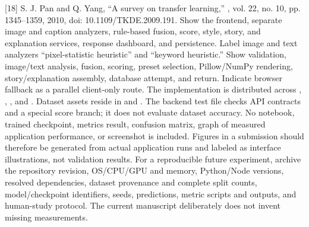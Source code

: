 \documentclass[conference]{IEEEtran}
\begin{document}
{}[18] S. J. Pan and Q. Yang, “A survey on transfer learning,” , vol. 22, no. 10, pp. 1345–1359, 2010, doi: 10.1109/TKDE.2009.191.\markdownRendererInterblockSeparator
{}
\markdownRendererSectionEnd \markdownRendererSectionBegin
{}\markdownRendererInterblockSeparator
{}\markdownRendererSectionBegin
{}\markdownRendererInterblockSeparator
{} Show the frontend, separate image and caption analyzers, rule-based fusion, score, style, story, and explanation services, response dashboard, and persistence. Label image and text analyzers “pixel-statistic heuristic” and “keyword heuristic.”\markdownRendererParagraphSeparator
{} Show validation, image/text analysis, fusion, scoring, preset selection, Pillow/NumPy rendering, story/explanation assembly, database attempt, and return. Indicate browser fallback as a parallel client-only route.\markdownRendererInterblockSeparator
{}
\markdownRendererSectionEnd \markdownRendererSectionBegin
{}\markdownRendererInterblockSeparator
{}The implementation is distributed across , , , and . Dataset assets reside in  and . The backend test file checks API contracts and a special score branch; it does not evaluate dataset accuracy. No notebook, trained checkpoint, metrics result, confusion matrix, graph of measured application performance, or screenshot is included. Figures in a submission should therefore be generated from actual application runs and labeled as interface illustrations, not validation results.\markdownRendererParagraphSeparator
{}For a reproducible future experiment, archive the repository revision, OS/CPU/GPU and memory, Python/Node versions, resolved dependencies, dataset provenance and complete split counts, model/checkpoint identifiers, seeds, predictions, metric scripts and outputs, and human-study protocol. The current manuscript deliberately does not invent missing measurements.
\markdownRendererSectionEnd 
\markdownRendererSectionEnd 
\markdownRendererSectionEnd \markdownRendererDocumentEnd
\end{document}
